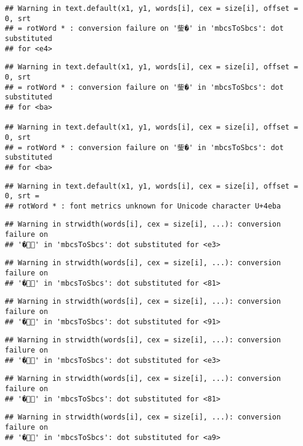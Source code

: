 \documentclass[]{article}
\begin{document}
\begin{verbatim}
## Warning in text.default(x1, y1, words[i], cex = size[i], offset = 0, srt
## = rotWord * : conversion failure on '鈭�' in 'mbcsToSbcs': dot substituted
## for <e4>
\end{verbatim}

\begin{verbatim}
## Warning in text.default(x1, y1, words[i], cex = size[i], offset = 0, srt
## = rotWord * : conversion failure on '鈭�' in 'mbcsToSbcs': dot substituted
## for <ba>

## Warning in text.default(x1, y1, words[i], cex = size[i], offset = 0, srt
## = rotWord * : conversion failure on '鈭�' in 'mbcsToSbcs': dot substituted
## for <ba>
\end{verbatim}

\begin{verbatim}
## Warning in text.default(x1, y1, words[i], cex = size[i], offset = 0, srt =
## rotWord * : font metrics unknown for Unicode character U+4eba
\end{verbatim}

\begin{verbatim}
## Warning in strwidth(words[i], cex = size[i], ...): conversion failure on
## '�' in 'mbcsToSbcs': dot substituted for <e3>
\end{verbatim}

\begin{verbatim}
## Warning in strwidth(words[i], cex = size[i], ...): conversion failure on
## '�' in 'mbcsToSbcs': dot substituted for <81>
\end{verbatim}

\begin{verbatim}
## Warning in strwidth(words[i], cex = size[i], ...): conversion failure on
## '�' in 'mbcsToSbcs': dot substituted for <91>
\end{verbatim}

\begin{verbatim}
## Warning in strwidth(words[i], cex = size[i], ...): conversion failure on
## '�' in 'mbcsToSbcs': dot substituted for <e3>
\end{verbatim}

\begin{verbatim}
## Warning in strwidth(words[i], cex = size[i], ...): conversion failure on
## '�' in 'mbcsToSbcs': dot substituted for <81>
\end{verbatim}

\begin{verbatim}
## Warning in strwidth(words[i], cex = size[i], ...): conversion failure on
## '�' in 'mbcsToSbcs': dot substituted for <a9>
\end{verbatim}
\end{document}
